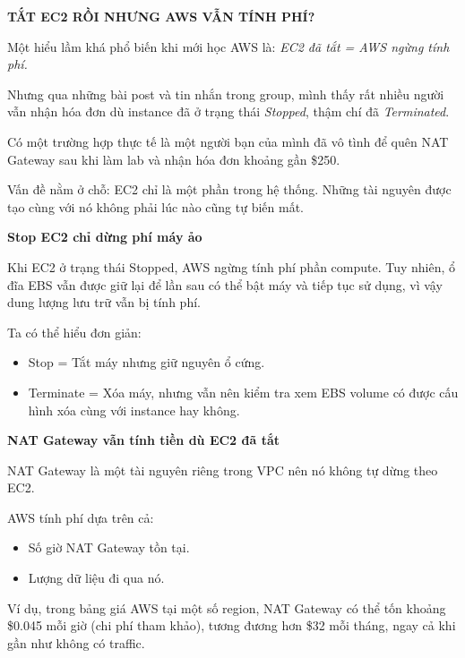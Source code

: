 \vspace{0.5em}\noindent\textbf{TẮT EC2 RỒI NHƯNG AWS VẪN TÍNH
PHÍ?}\par

Một hiểu lầm khá phổ biến khi mới học AWS là: \emph{EC2 đã tắt = AWS
ngừng tính phí.}

Nhưng qua những bài post và tin nhắn trong group, mình thấy rất nhiều
người vẫn nhận hóa đơn dù instance đã ở trạng thái \emph{Stopped}, thậm
chí đã \emph{Terminated}.

Có một trường hợp thực tế là một người bạn của mình đã vô tình để quên
NAT Gateway sau khi làm lab và nhận hóa đơn khoảng gần \$250.

Vấn đề nằm ở chỗ: EC2 chỉ là một phần trong hệ thống. Những tài nguyên
được tạo cùng với nó không phải lúc nào cũng tự biến mất.

\vspace{0.5em}\noindent\textbf{Stop EC2 chỉ dừng phí máy
ảo}\par

Khi EC2 ở trạng thái Stopped, AWS ngừng tính phí phần compute. Tuy
nhiên, ổ đĩa EBS vẫn được giữ lại để lần sau có thể bật máy và tiếp tục
sử dụng, vì vậy dung lượng lưu trữ vẫn bị tính phí.

Ta có thể hiểu đơn giản:

\begin{itemize}
\tightlist
\item
  Stop = Tắt máy nhưng giữ nguyên ổ cứng.
\item
  Terminate = Xóa máy, nhưng vẫn nên kiểm tra xem EBS volume có được cấu
  hình xóa cùng với instance hay không.
\end{itemize}

\vspace{0.5em}\noindent\textbf{NAT Gateway vẫn tính tiền dù EC2 đã
tắt}\par

NAT Gateway là một tài nguyên riêng trong VPC nên nó không tự dừng theo
EC2.

AWS tính phí dựa trên cả:

\begin{itemize}
\tightlist
\item
  Số giờ NAT Gateway tồn tại.
\item
  Lượng dữ liệu đi qua nó.
\end{itemize}

Ví dụ, trong bảng giá AWS tại một số region, NAT Gateway có thể tốn
khoảng \$0.045 mỗi giờ (chi phí tham khảo), tương đương hơn \$32 mỗi
tháng, ngay cả khi gần như không có traffic.

